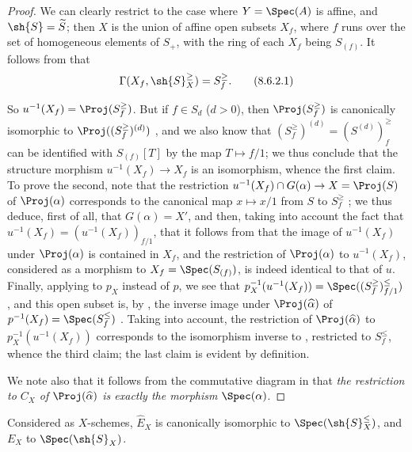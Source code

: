\begin{proof}
We can clearly restrict to the case where $Y=\Spec(A)$ is affine, and $\sh{S}=\widetilde{S}$;
then $X$ is the union of affine open subsets $X_f$, where $f$ runs over the set of homogeneous elements of $S_+$, with the ring of each $X_f$ being $S_{(f)}$.
It follows from  that
\[
\label{II.8.6.2.1}
  \Gamma(X_f, \sh{S}_X^\geq) = S_f^\geq.
\tag{8.6.2.1}
\]

So $u^{-1}(X_f)=\Proj(S_f^\geq)$.
But if $f\in S_d$ ($d>0$), then $\Proj(S_f^\geq)$ is canonically isomorphic to $\Proj((S_f^\geq)^{(d)})$ , and we also know that $(S_f^\geq)^{(d)}=(S^{(d)})_f^\geq$ can be identified with $S_{(f)}[T]$  by the map $T\mapsto f/1$;
we thus conclude  that the structure morphism $u^{-1}(X_f)\to X_f$ is an isomorphism, whence the first claim.
To prove the second, note that the restriction $u^{-1}(X_f)\cap G(\alpha)\to X=\Proj(S)$ of $\Proj(\alpha)$ corresponds to the canonical map $x\mapsto x/1$ from $S$ to $S_f^\geq$ ;
we thus deduce, first of all, that $G(\alpha)=X'$, and then, taking into account the fact that $u^{-1}(X_f)=(u^{-1}(X_f))_{f/1}$, that it follows from  that the image of $u^{-1}(X_f)$ under $\Proj(\alpha)$ is contained in $X_f$, and the restriction of $\Proj(\alpha)$ to $u^{-1}(X_f)$, considered as a morphism to $X_f=\Spec(S_{(f)})$, is indeed identical to that of $u$.
Finally, applying  to $p_X$ instead of $p$, we see that $p_X^{-1}(u^{-1}(X_f)) = \Spec((S_f^\geq)_{f/1}^\leq)$, and this open subset is, by , the inverse image under $\Proj(\widehat{\alpha})$ of $p^{-1}(X_f)=\Spec(S_f^\leq)$ .
Taking  into account, the restriction of $\Proj(\widehat{\alpha})$ to $p_X^{-1}(u^{-1}(X_f))$ corresponds to the isomorphism inverse to , restricted to $S_f^\leq$, whence the third claim;
the last claim is evident by definition.

We note also that it follows from the commutative diagram in  that \emph{the restriction to $C_X$ of $\Proj(\widehat{\alpha})$ is exactly the morphism $\Spec(\alpha)$}.
\end{proof}

\begin{corollary}[8.6.3]
\label{II.8.6.3}
Considered as $X$-schemes, $\widehat{E}_X$ is canonically isomorphic to $\Spec(\sh{S}_X^\leq)$, and $E_X$ to $\Spec(\sh{S}_X)$.
\end{corollary}

